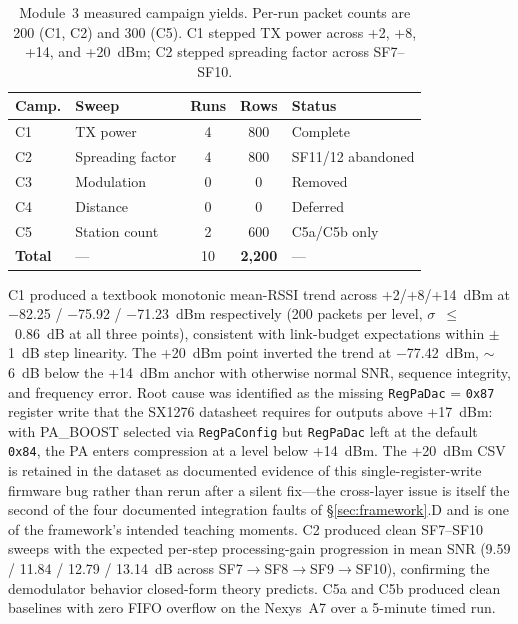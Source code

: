 \documentclass[conference]{IEEEtran}
\begin{document}
\begin{table}[t]
\centering
\caption{Module~3 measured campaign yields. Per-run packet counts are 200 (C1, C2) and 300 (C5). C1 stepped TX power across +2, +8, +14, and +20~dBm; C2 stepped spreading factor across SF7--SF10.}
\label{tab:m3yields}
\begin{tabular}{l l c c l}
\toprule
\textbf{Camp.} & \textbf{Sweep} & \textbf{Runs} & \textbf{Rows} & \textbf{Status} \\
\midrule
C1 & TX power            & 4 & 800 & Complete \\
C2 & Spreading factor    & 4 & 800 & SF11/12 abandoned \\
C3 & Modulation          & 0 & 0   & Removed \\
C4 & Distance            & 0 & 0   & Deferred \\
C5 & Station count       & 2 & 600 & C5a/C5b only \\
\midrule
\textbf{Total} & --- & 10 & \textbf{2{,}200} & --- \\
\bottomrule
\end{tabular}
\end{table}

C1 produced a textbook monotonic mean-RSSI trend across +2/+8/+14~dBm at $-$82.25 / $-$75.92 / $-$71.23~dBm respectively (200 packets per level, $\sigma$~$\leq$~0.86~dB at all three points), consistent with link-budget expectations within $\pm$1~dB step linearity. The +20~dBm point inverted the trend at $-$77.42~dBm, $\sim$6~dB below the +14~dBm anchor with otherwise normal SNR, sequence integrity, and frequency error. Root cause was identified as the missing \texttt{RegPaDac} = \texttt{0x87} register write that the SX1276 datasheet requires for outputs above +17~dBm: with PA\_BOOST selected via \texttt{RegPaConfig} but \texttt{RegPaDac} left at the default \texttt{0x84}, the PA enters compression at a level below +14~dBm. The +20~dBm CSV is retained in the dataset as documented evidence of this single-register-write firmware bug rather than rerun after a silent fix---the cross-layer issue is itself the second of the four documented integration faults of \S\ref{sec:framework}.D and is one of the framework's intended teaching moments. C2 produced clean SF7--SF10 sweeps with the expected per-step processing-gain progression in mean SNR (9.59 / 11.84 / 12.79 / 13.14~dB across SF7$\to$SF8$\to$SF9$\to$SF10), confirming the demodulator behavior closed-form theory predicts. C5a and C5b produced clean baselines with zero FIFO overflow on the Nexys~A7 over a 5-minute timed run.
\end{document}
